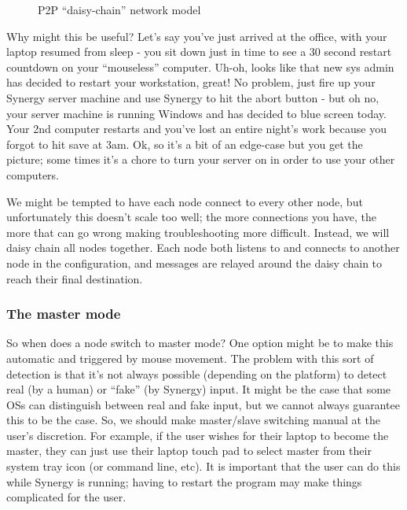 \begin{figure}[ht!]
  \centering
  
  \caption{P2P ``daisy-chain'' network model}
  \label{fig:p2p}
\end{figure}


Why might this be useful? Let's say you've just arrived at the
office, with your laptop resumed from sleep - you sit down just in time to see
a 30 second restart countdown on your ``mouseless'' computer. Uh-oh, looks like
that new sys admin has decided to restart your workstation, great! No problem, 
just fire up your Synergy server machine and use Synergy to hit the abort 
button - but oh no, your server machine is running Windows and has decided to 
blue screen today. Your 2nd computer restarts and you've lost an entire night's
work because you forgot to hit save at 3am. Ok, so it's a bit of an edge-case
but you get the picture; some times it's a chore to turn your server on in
order to use your other computers.

We might be tempted to have each node connect to every other node, but
unfortunately this doesn't scale too well; the more connections you have, the
more that can go wrong making troubleshooting more difficult. Instead, we will
daisy chain all nodes together. Each node both listens to and connects to 
another node in the configuration, and messages are relayed around the daisy
chain to reach their final destination.

\subsubsection{The master mode}

So when does a node switch to master mode? One option might be to make this
automatic and triggered by mouse movement. The problem with this sort of
detection is that it's not always possible (depending on the platform) to
detect real (by a human) or ``fake'' (by Synergy) input. It might be the
case that some OSs can distinguish between real and fake input, but we cannot
always guarantee this to be the case. So, we should make master/slave switching
manual at the user's discretion. For example, if the user wishes for their
laptop to become the master, they can just use their laptop touch pad to
select master from their system tray icon (or command line, etc). It is
important that the user can do this while Synergy is running; having to restart
the program may make things complicated for the user.

